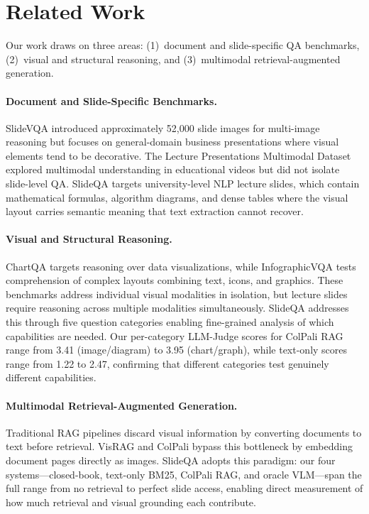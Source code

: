 \documentclass{article} %
\begin{document}
\section{Related Work}

Our work draws on three areas: (1)~document and slide-specific QA benchmarks, (2)~visual and structural reasoning, and (3)~multimodal retrieval-augmented generation.

\paragraph{Document and Slide-Specific Benchmarks.}
SlideVQA \citep{tanaka2023slidevqa} introduced approximately 52,000 slide images for multi-image reasoning but focuses on general-domain business presentations where visual elements tend to be decorative. The Lecture Presentations Multimodal Dataset \citep{lee2023lecture} explored multimodal understanding in educational videos but did not isolate slide-level QA. SlideQA targets university-level NLP lecture slides, which contain mathematical formulas, algorithm diagrams, and dense tables where the visual layout carries semantic meaning that text extraction cannot recover.

\paragraph{Visual and Structural Reasoning.}
ChartQA \citep{masry2022chartqa} targets reasoning over data visualizations, while InfographicVQA \citep{mathew2021infographicvqa} tests comprehension of complex layouts combining text, icons, and graphics. These benchmarks address individual visual modalities in isolation, but lecture slides require reasoning across multiple modalities simultaneously. SlideQA addresses this through five question categories enabling fine-grained analysis of which capabilities are needed. Our per-category LLM-Judge scores for ColPali RAG range from 3.41 (image/diagram) to 3.95 (chart/graph), while text-only scores range from 1.22 to 2.47, confirming that different categories test genuinely different capabilities.

\paragraph{Multimodal Retrieval-Augmented Generation.}
Traditional RAG pipelines discard visual information by converting documents to text before retrieval. VisRAG \citep{yu2024visrag} and ColPali \citep{faysse2024colpali} bypass this bottleneck by embedding document pages directly as images. SlideQA adopts this paradigm: our four systems---closed-book, text-only BM25, ColPali RAG, and oracle VLM---span the full range from no retrieval to perfect slide access, enabling direct measurement of how much retrieval and visual grounding each contribute.
\end{document}
